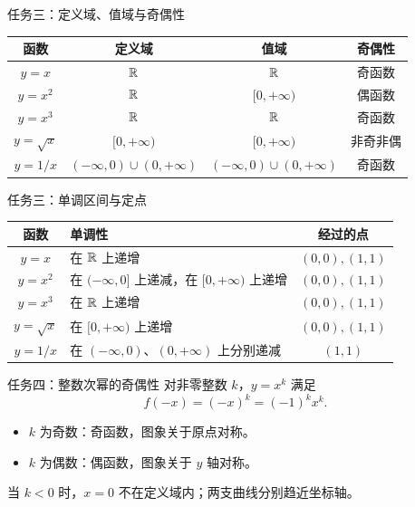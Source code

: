 \documentclass[aspectratio=169,10pt]{beamer}
\begin{document}
\begin{frame}[t]{任务三：定义域、值域与奇偶性}
 \centering\normalsize
 \renewcommand{\arraystretch}{1.65}
 \begin{tabular}{c|c|c|c}
  \toprule 函数 & 定义域 & 值域 & 奇偶性\\\midrule
  $y=x$ & $\mathbb R$ & $\mathbb R$ & 奇函数\\
  $y=x^2$ & $\mathbb R$ & $[0,+\infty)$ & 偶函数\\
  $y=x^3$ & $\mathbb R$ & $\mathbb R$ & 奇函数\\
  $y=\sqrt x$ & $[0,+\infty)$ & $[0,+\infty)$ & 非奇非偶\\
  $y=1/x$ & $(-\infty,0)\cup(0,+\infty)$ & $(-\infty,0)\cup(0,+\infty)$ & 奇函数\\\bottomrule
 \end{tabular}
 \gap
\end{frame}

\begin{frame}[t]{任务三：单调区间与定点}
 \normalsize\renewcommand{\arraystretch}{1.7}
 \centering
 \begin{tabular}{c|l|c}
  \toprule 函数 & 单调性 & 经过的点\\\midrule
  $y=x$ & 在 $\mathbb R$ 上递增 & $(0,0),(1,1)$\\
  $y=x^2$ & 在 $(-\infty,0]$ 上递减，在 $[0,+\infty)$ 上递增 & $(0,0),(1,1)$\\
  $y=x^3$ & 在 $\mathbb R$ 上递增 & $(0,0),(1,1)$\\
  $y=\sqrt x$ & 在 $[0,+\infty)$ 上递增 & $(0,0),(1,1)$\\
  $y=1/x$ & 在 $(-\infty,0)$、$(0,+\infty)$ 上分别递减 & $(1,1)$\\\bottomrule
 \end{tabular}
 \gap
\end{frame}

\begin{frame}[t]{任务四：整数次幂的奇偶性}
 对非零整数 $k$，$y=x^k$ 满足
 \[f(-x)=(-x)^k=(-1)^k x^k.\]
 \pause
 \begin{itemize}
  \item $k$ 为奇数：奇函数，图象关于原点对称。
  \item $k$ 为偶数：偶函数，图象关于 $y$ 轴对称。
 \end{itemize}
 \gap
 当 $k<0$ 时，$x=0$ 不在定义域内；两支曲线分别趋近坐标轴。\\
\end{frame}
\end{document}
